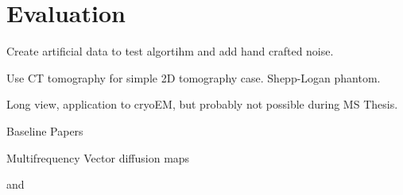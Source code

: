 \chapter{Evaluation}
\label{sec:evaluation}


Create artificial data to test algortihm
and add hand crafted noise.

Use CT tomography for simple 2D tomography case.
Shepp-Logan phantom.

Long view, application to cryoEM, 
but probably not possible during MS Thesis.

Baseline Papers

Multifrequency Vector diffusion maps \cite{multiDiffusionMaps}

and \cite{LaplaceRandomProjections}